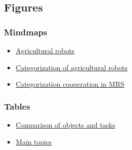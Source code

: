     \subsection{Figures}

    \subsubsection{Mindmaps}
    \begin{itemize}
        \item \hyperlink{fig:mindmap_agribots}{Agricultural robots}
        \item \hyperlink{fig:category_mindmap}{Categorization of agricultural robots}
        \item \hyperlink{fig:mrs_mindmap}{Categorization cooperation in MRS}
    \end{itemize}
    \subsubsection{Tables}
    \begin{itemize}
        \item \hyperref[table:objects_and_tasks]{Comparison of objects and tasks}
        \item \hyperref[table:main_topics]{Main topics}
    \end{itemize}

